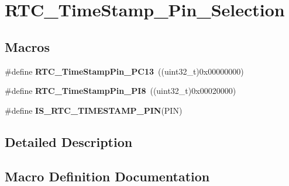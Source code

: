 \hypertarget{group___r_t_c___time_stamp___pin___selection}{}\section{R\+T\+C\+\_\+\+Time\+Stamp\+\_\+\+Pin\+\_\+\+Selection}
\label{group___r_t_c___time_stamp___pin___selection}
\subsection*{Macros}
\begin{DoxyCompactItemize}
\item 
\hypertarget{group___r_t_c___time_stamp___pin___selection_gac71b083719de65957ef1577e047bdc74}{}\#define {\bfseries R\+T\+C\+\_\+\+Time\+Stamp\+Pin\+\_\+\+P\+C13}~((uint32\+\_\+t)0x00000000)\label{group___r_t_c___time_stamp___pin___selection_gac71b083719de65957ef1577e047bdc74}

\item 
\hypertarget{group___r_t_c___time_stamp___pin___selection_ga82b60e881b00b0106a2e75df19760ad0}{}\#define {\bfseries R\+T\+C\+\_\+\+Time\+Stamp\+Pin\+\_\+\+P\+I8}~((uint32\+\_\+t)0x00020000)\label{group___r_t_c___time_stamp___pin___selection_ga82b60e881b00b0106a2e75df19760ad0}

\item 
\#define {\bfseries I\+S\+\_\+\+R\+T\+C\+\_\+\+T\+I\+M\+E\+S\+T\+A\+M\+P\+\_\+\+P\+I\+N}(P\+I\+N)
\end{DoxyCompactItemize}


\subsection{Detailed Description}


\subsection{Macro Definition Documentation}
\hypertarget{group___r_t_c___time_stamp___pin___selection_ga5558a9d932619b51a5a60fa4746dd852}{}
